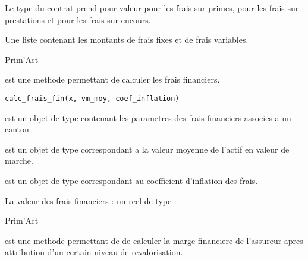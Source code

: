 \documentclass[a4paper]{book}
\begin{document}
%
\begin{Details}\relax
Le type du contrat prend pour valeur  pour les frais sur primes,  pour les frais
sur prestations et  pour les frais sur encours.
\end{Details}
%
\begin{Value}
Une liste contenant les montants de frais fixes et de frais variables.
\end{Value}
%
\begin{Author}\relax
Prim'Act
\end{Author}
%
\begin{Description}\relax
{} est une methode permettant de calculer les frais financiers.
\end{Description}
%
\begin{Usage}
\begin{verbatim}
calc_frais_fin(x, vm_moy, coef_inflation)
\end{verbatim}
\end{Usage}
%
\begin{Arguments}
\begin{ldescription}
\item[\code{x}] est un objet de type  contenant les parametres des frais financiers associes a un canton.

\item[\code{vm\_moy}] est un objet de type  correspondant a la valeur moyenne de l'actif en valeur
de marche.

\item[\code{coef\_inflation}] est un objet de type  correspondant au coefficient d'inflation des frais.
\end{ldescription}
\end{Arguments}
%
\begin{Value}
La valeur des frais financiers : un reel de type .
\end{Value}
%
\begin{Author}\relax
Prim'Act
\end{Author}
%
\begin{Description}\relax
{} est une methode permettant de
de calculer la marge financiere de l'assureur apres attribution d'un certain niveau de revalorisation.
\end{Description}
\end{document}
